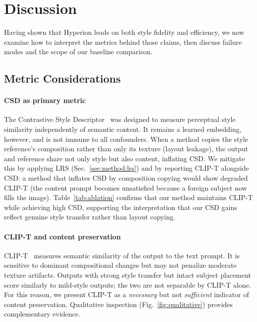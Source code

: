 \section{Discussion}
\label{sec:discussion}

Having shown that Hyperion leads on both style fidelity and efficiency, we now
examine how to interpret the metrics behind those claims, then discuss failure
modes and the scope of our baseline comparison.

\subsection{Metric Considerations}
\label{sec:discussion:metrics}

\paragraph{CSD as primary metric}
The Contrastive Style Descriptor~\cite{somepalli2024measuring} was designed to
measure perceptual style similarity independently of semantic content.
It remains a learned embedding, however, and is not immune to all confounders.
When a method copies the style reference's composition rather than only its
texture (layout leakage), the output and reference share not only style but also
content, inflating CSD.
We mitigate this by applying LRS (Sec.~\ref{sec:method:lrs}) and by
reporting CLIP-T alongside CSD: a method that inflates CSD by composition
copying would show degraded CLIP-T (the content prompt becomes unsatisfied
because a foreign subject now fills the image).
Table~\ref{tab:ablation} confirms that our method maintains CLIP-T while
achieving high CSD, supporting the interpretation that our CSD gains reflect
genuine style transfer rather than layout copying.

\paragraph{CLIP-T and content preservation}
CLIP-T~\cite{radford2021learning} measures semantic similarity of the output to the text prompt.
It is sensitive to dominant compositional changes but may not penalize moderate
texture artifacts.
Outputs with strong style transfer but intact subject placement score similarly
to mild-style outputs; the two are not separable by CLIP-T alone.
For this reason, we present CLIP-T as a \emph{necessary} but not
\emph{sufficient} indicator of content preservation.
Qualitative inspection (Fig.~\ref{fig:qualitative}) provides complementary
evidence.

